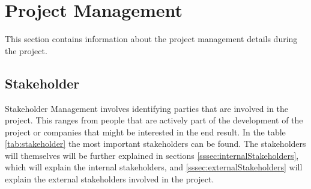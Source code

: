 \section{Project Management}\label{sec:projectManagement}
This section contains information about the project management details during the project.
\newpage
\subsection{Stakeholder}
Stakeholder Management involves identifying parties that are involved in the project. This ranges from people that are actively part of the development of the project or companies that might be interested in the end result. In the table \ref{tab:stakeholder} the most important stakeholders can be found. The stakeholders will themselves will be further explained in sections \ref{sssec:internalStakeholders}, which will explain the internal stakeholders, and \ref{sssec:externalStakeholders} will explain the external stakeholders involved in the project.
